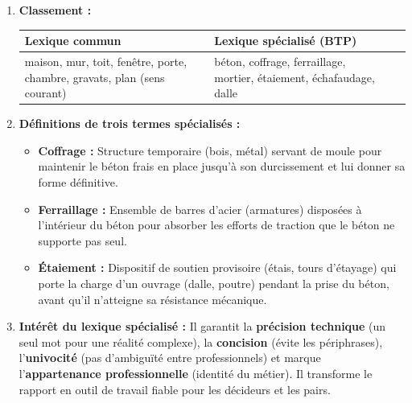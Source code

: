 \documentclass[11pt]{article}
\newcounter{popsec}
\newcounter{popsub}
\newcommand{\courssub}[1]{%
  \stepcounter{popsub}%
  \par\vspace{9pt}\noindent{\popxbold\fontsize{11.5}{13}\selectfont\color{popink}{\color{poporange}\thepopsec.\thepopsub}\hspace{6pt}#1}\par\nopagebreak\vspace{4pt}
}
\begin{document}
\courssub{Je m'entraîne}

\begin{corrige}
\begin{enumerate}
\item \textbf{Classement :}
\begin{center}
\begin{tabularx}{\linewidth}{|l|X|X|}\hline
\rowcolor{popblueL}
\textbf{Lexique commun} & \textbf{Lexique spécialisé (BTP)} \\ \hline
maison, mur, toit, fenêtre, porte, chambre, gravats, plan (sens courant) & béton, coffrage, ferraillage, mortier, étaiement, échafaudage, dalle \\ \hline
\end{tabularx}
\end{center}
\item \textbf{Définitions de trois termes spécialisés :}
\begin{itemize}
\item \textbf{Coffrage :} Structure temporaire (bois, métal) servant de moule pour maintenir le béton frais en place jusqu'à son durcissement et lui donner sa forme définitive.
\item \textbf{Ferraillage :} Ensemble de barres d'acier (armatures) disposées à l'intérieur du béton pour absorber les efforts de traction que le béton ne supporte pas seul.
\item \textbf{Étaiement :} Dispositif de soutien provisoire (étais, tours d'étayage) qui porte la charge d'un ouvrage (dalle, poutre) pendant la prise du béton, avant qu'il n'atteigne sa résistance mécanique.
\end{itemize}
\item \textbf{Intérêt du lexique spécialisé :} Il garantit la \textbf{précision technique} (un seul mot pour une réalité complexe), la \textbf{concision} (évite les périphrases), l'\textbf{univocité} (pas d'ambiguïté entre professionnels) et marque l'\textbf{appartenance professionnelle} (identité du métier). Il transforme le rapport en outil de travail fiable pour les décideurs et les pairs.
\end{enumerate}
\end{corrige}
\end{document}
